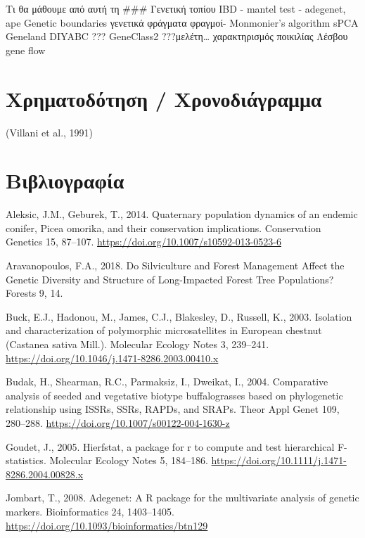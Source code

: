 \documentclass[12pt,a4paper,]{report}
\begin{document}
Τι θα μάθουμε από αυτή τη \#\#\# Γενετική τοπίου IBD - mantel test -
adegenet, ape Genetic boundaries γενετικά φράγματα φραγμοί- Monmonier's
algorithm sPCA Geneland DIYABC ??? GeneClass2 ???μελέτη\ldots{}
χαρακτηρισμός ποικιλίας Λέσβου gene flow

\hypertarget{-}{%
\section{Χρηματοδότηση / Χρονοδιάγραμμα}\label{-}}

(Villani et al., 1991)

\section{Βιβλιογραφία}

\hypertarget{refs}{}
\leavevmode\hypertarget{ref-Aleksic2014}{}%
Aleksic, J.M., Geburek, T., 2014. Quaternary population dynamics of an
endemic conifer, Picea omorika, and their conservation implications.
Conservation Genetics 15, 87--107.
\url{https://doi.org/10.1007/s10592-013-0523-6}

\leavevmode\hypertarget{ref-Aravanopoulos2018a}{}%
Aravanopoulos, F.A., 2018. Do Silviculture and Forest Management Affect
the Genetic Diversity and Structure of Long-Impacted Forest Tree
Populations? Forests 9, 14.

\leavevmode\hypertarget{ref-buck_isolation_2003}{}%
Buck, E.J., Hadonou, M., James, C.J., Blakesley, D., Russell, K., 2003.
Isolation and characterization of polymorphic microsatellites in
European chestnut (Castanea sativa Mill.). Molecular Ecology Notes 3,
239--241. \url{https://doi.org/10.1046/j.1471-8286.2003.00410.x}

\leavevmode\hypertarget{ref-budak_comparative_2004}{}%
Budak, H., Shearman, R.C., Parmaksiz, I., Dweikat, I., 2004. Comparative
analysis of seeded and vegetative biotype buffalograsses based on
phylogenetic relationship using ISSRs, SSRs, RAPDs, and SRAPs. Theor
Appl Genet 109, 280--288.
\url{https://doi.org/10.1007/s00122-004-1630-z}

\leavevmode\hypertarget{ref-goudet_hierfstat_2005}{}%
Goudet, J., 2005. Hierfstat, a package for r to compute and test
hierarchical F-statistics. Molecular Ecology Notes 5, 184--186.
\url{https://doi.org/10.1111/j.1471-8286.2004.00828.x}

\leavevmode\hypertarget{ref-Jombart2008}{}%
Jombart, T., 2008. Adegenet: A R package for the multivariate analysis
of genetic markers. Bioinformatics 24, 1403--1405.
\url{https://doi.org/10.1093/bioinformatics/btn129}
\end{document}
